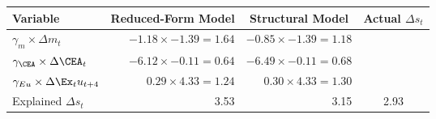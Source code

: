 
\begin{center}\footnotesize
\begin{tabular}{@{}lrrc@{}}\\
\toprule
     Variable & \multicolumn{1}{c}{Reduced-Form Model }& \multicolumn{1}{c}{Structural Model }& \multicolumn{1}{c}{Actual $\Delta s_t$ }\\
\midrule
$\gamma_m\times\Delta m_t$ & $ -1.18 \times -1.39 = 1.64 $ & $ -0.85 \times -1.39 = 1.18 $ & \\
$\gamma_\CEA\times\Delta \CEA_t$ & $ -6.12 \times -0.11 = 0.64 $ & $ -6.49 \times -0.11 = 0.68 $ &  \\
$\gamma_{Eu}\times\Delta \Ex_t u_{t+4} $ & $ 0.29 \times 4.33 = 1.24 $ & $ 0.30 \times 4.33 = 1.30 $ & \\
\midrule
Explained $\Delta s_t$ &  3.53 &  3.15 & 2.93\\
\bottomrule
\end{tabular}
\end{center}
